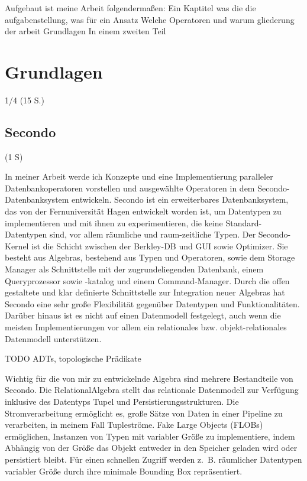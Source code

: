 \documentclass[a4paper,12pt,twoside]{article}
\begin{document}
Aufgebaut ist meine Arbeit folgendermaßen: Ein Kaptitel 
was die die aufgabenstellung, was für ein Ansatz
Welche Operatoren und warum
gliederung der arbeit
Grundlagen
In einem zweiten Teil 



\section{Grundlagen}
1/4 (15 S.)

\subsection{Secondo} (1 S)

In meiner Arbeit werde ich Konzepte und eine Implementierung paralleler Datenbankoperatoren vorstellen und ausgewählte Operatoren in dem Secondo-Datenbanksystem entwickeln. Secondo ist ein erweiterbares Datenbanksystem, das von der Fernuniversität Hagen entwickelt worden ist, um Datentypen zu implementieren und mit ihnen zu experimentieren, die keine Standard-Datentypen sind, vor allem räumliche und raum-zeitliche Typen. Der Secondo-Kernel ist die Schicht zwischen der Berkley-DB und GUI sowie Optimizer. Sie besteht aus Algebras, bestehend aus Typen und Operatoren, sowie dem Storage Manager als Schnittstelle mit der zugrundeliegenden Datenbank, einem Queryprozessor sowie -katalog und einem Command-Manager. Durch die offen gestaltete und klar definierte Schnittstelle zur Integration neuer Algebras hat Secondo eine sehr große Flexibilität gegenüber Datentypen und Funktionalitäten. Darüber hinaus ist es nicht auf einen Datenmodell festgelegt, auch wenn die meisten Implementierungen vor allem ein relationales bzw. objekt-relationales Datenmodell unterstützen.

TODO ADTs, topologische Prädikate

Wichtig für die von mir zu entwickelnde Algebra sind mehrere Bestandteile von Secondo. Die RelationalAlgebra stellt das relationale Datenmodell zur Verfügung inklusive des Datentyps Tupel und Persistierungsstrukturen. Die Stromverarbeitung ermöglicht es, große Sätze von Daten in einer Pipeline zu verarbeiten, in meinem Fall Tupleströme. Fake Large Objects (FLOBs) ermöglichen, Instanzen von Typen mit variabler Größe zu implementiere, indem Abhängig von der Größe das Objekt entweder in den Speicher geladen wird oder persistiert bleibt. Für einen schnellen Zugriff werden z.~B. räumlicher Datentypen variabler Größe durch ihre minimale Bounding Box repräsentiert.
\end{document}
